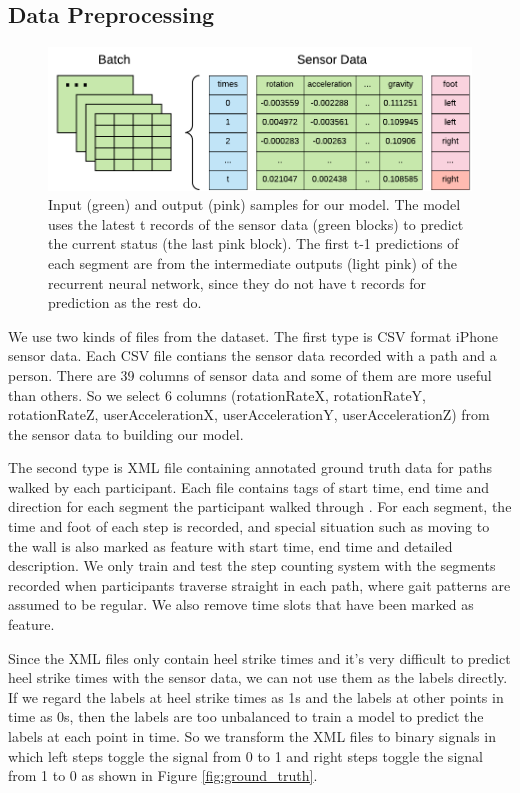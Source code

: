 \documentclass[11pt]{article}
\begin{document}
{\subsection{Data Preprocessing}

\begin{figure}[ht]
\centering
\includegraphics[scale=1]{input2}
\caption{Input (green) and output (pink) samples for our model. The model uses the latest t records of the sensor data (green blocks) to predict the current status (the last pink block). The first t-1 predictions of each segment are from the intermediate outputs (light pink) of the recurrent neural network, since they do not have t records for prediction as the rest do.}
\label{fig:batch_sensor_data}
\end{figure}

We use two kinds of files from the dataset. The first type is CSV format iPhone sensor data.  Each CSV file contians the sensor data recorded with a path and a person. There are 39 columns of sensor data and some of them are more useful than others. So we select 6 columns (rotationRateX, rotationRateY, rotationRateZ,  userAccelerationX, userAccelerationY, userAccelerationZ) from the sensor data to building our model. 

The second type is XML file containing annotated ground truth data for paths walked by each participant. Each file contains tags of start time, end time and direction for each segment the participant walked through . For each segment, the time and foot of each step is recorded, and special situation such as moving to the wall is also marked as feature with start time, end time and detailed description. We only train and test the step counting system with the segments recorded when participants traverse straight in each path, where gait patterns are assumed to be regular. We also remove time slots that have been marked as feature. 

Since the XML files only contain heel strike times and it's very difficult to predict heel strike times with the sensor data, we can not use them as the labels directly. If we regard the labels at heel strike times as 1s and the labels at other points in time as 0s, then the labels are too unbalanced to train a model to predict the labels at each point in time. So we transform the XML files to binary signals in which left steps toggle the signal from 0 to 1 and right steps toggle the signal from 1 to 0 as shown in Figure \ref{fig:ground_truth}.

}
\end{document}
